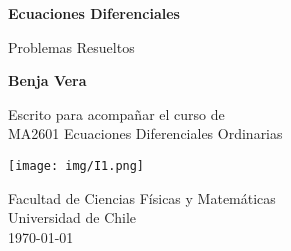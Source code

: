 \begin{titlepage}
    \begin{center}
        \vspace*{1cm}
            
        \Huge
        \textbf{Ecuaciones Diferenciales}
            
        \vspace{0.5cm}
        \LARGE
        Problemas Resueltos
            
        \vspace{1.5cm}
            
        \textbf{Benja Vera}
            
        \vfill
            
        Escrito para acompañar el curso de\\
        MA2601 Ecuaciones Diferenciales Ordinarias
            
        \vspace{0.8cm}
            
        \texttt{[image: img/I1.png]}
            
        \Large
        Facultad de Ciencias Físicas y Matemáticas\\
        Universidad de Chile\\
        \today
            
    \end{center}
\end{titlepage}